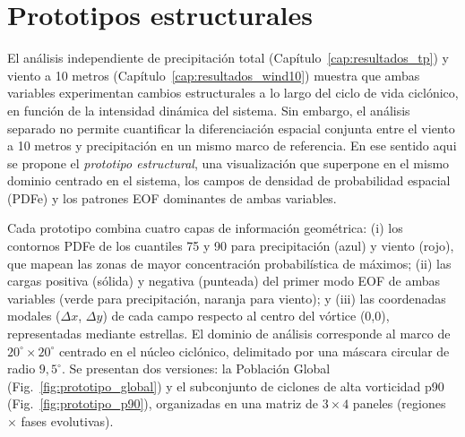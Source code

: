 \chapter{Prototipos estructurales}\label{cap:prototipos}


El análisis independiente de precipitación total (Capítulo~\ref{cap:resultados_tp}) y viento a 10 metros (Capítulo~\ref{cap:resultados_wind10}) muestra que ambas variables experimentan cambios estructurales a lo largo del ciclo de vida ciclónico, en función de la intensidad dinámica del sistema. 
Sin embargo, el análisis separado no permite cuantificar la diferenciación espacial conjunta entre el viento a 10 metros y precipitación en un mismo marco de referencia. 
En ese sentido aqui se propone el \textit{prototipo estructural}, una visualización que superpone en el mismo dominio centrado en el sistema, los campos de densidad de probabilidad espacial (PDFe) y los patrones EOF dominantes de ambas variables.

Cada prototipo combina cuatro capas de información geométrica: (i) los contornos PDFe de los cuantiles 75 y 90 para precipitación (azul) y viento (rojo), que mapean las zonas de mayor concentración probabilística de máximos; (ii) las cargas positiva (sólida) y negativa (punteada) del primer modo EOF de ambas variables (verde para precipitación, naranja para viento); y (iii) las coordenadas modales ($\Delta x$, $\Delta y$) de cada campo respecto al centro del vórtice (0,0), representadas mediante estrellas. 
El dominio de análisis corresponde al marco de $20^{\circ} \times 20^{\circ}$ centrado en el núcleo ciclónico, delimitado por una máscara circular de radio $9{,}5^{\circ}$. 
Se presentan dos versiones: la Población Global (Fig.~\ref{fig:prototipo_global}) y el subconjunto de ciclones de alta vorticidad p90 (Fig.~\ref{fig:prototipo_p90}), organizadas en una matriz de $3 \times 4$ paneles (regiones $\times$ fases evolutivas).

